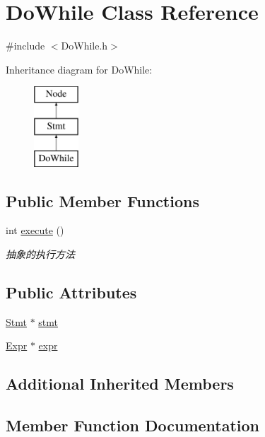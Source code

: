 \hypertarget{class_do_while}{}\section{Do\+While Class Reference}
\label{class_do_while}


{\ttfamily \#include $<$Do\+While.\+h$>$}

Inheritance diagram for Do\+While\+:\begin{figure}[H]
\begin{center}
\leavevmode
\includegraphics[height=3.000000cm]{class_do_while}
\end{center}
\end{figure}
\subsection*{Public Member Functions}
\begin{DoxyCompactItemize}
\item 
int \hyperlink{class_do_while_adb6934e033f44c6b52b1079faf1d84cf}{execute} ()
\begin{DoxyCompactList}\small\item\em 抽象的执行方法 \end{DoxyCompactList}\end{DoxyCompactItemize}
\subsection*{Public Attributes}
\begin{DoxyCompactItemize}
\item 
\hyperlink{class_stmt}{Stmt} $\ast$ \hyperlink{class_do_while_a0aee68f104ddceeb30a4e061cf315e0f}{stmt}
\item 
\hyperlink{class_expr}{Expr} $\ast$ \hyperlink{class_do_while_a55d5ffb9c6bee10f8375f028705e4901}{expr}
\end{DoxyCompactItemize}
\subsection*{Additional Inherited Members}


\subsection{Member Function Documentation}
\mbox{\label{class_do_while_adb6934e033f44c6b52b1079faf1d84cf}} 
